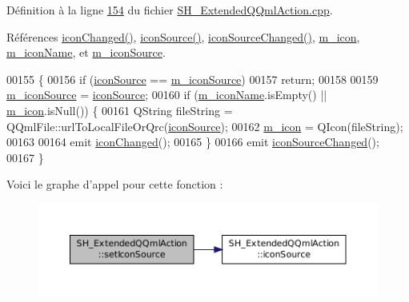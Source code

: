 Définition à la ligne \hyperlink{SH__ExtendedQQmlAction_8cpp_source_l00154}{154} du fichier \hyperlink{SH__ExtendedQQmlAction_8cpp_source}{S\-H\-\_\-\-Extended\-Q\-Qml\-Action.\-cpp}.



Références \hyperlink{classSH__ExtendedQQmlAction_ac47156b58d63ae5408e8d06b3669005c}{icon\-Changed()}, \hyperlink{classSH__ExtendedQQmlAction_a4256635783087124d3df6fa9726e7d55}{icon\-Source()}, \hyperlink{classSH__ExtendedQQmlAction_a86d7d90947e9dcd0d80faba2734f580e}{icon\-Source\-Changed()}, \hyperlink{classSH__ExtendedQQmlAction_a4386f56e28c2c70cfedd16c1d8c2c4a4}{m\-\_\-icon}, \hyperlink{classSH__ExtendedQQmlAction_a3375d1504e5ec862ed05500bf529d95c}{m\-\_\-icon\-Name}, et \hyperlink{classSH__ExtendedQQmlAction_a61c8633eab1fa3b69752074220e785fc}{m\-\_\-icon\-Source}.


\begin{DoxyCode}
00155 \{
00156     \textcolor{keywordflow}{if} (\hyperlink{classSH__ExtendedQQmlAction_a4256635783087124d3df6fa9726e7d55}{iconSource} == \hyperlink{classSH__ExtendedQQmlAction_a61c8633eab1fa3b69752074220e785fc}{m\_iconSource})
00157         \textcolor{keywordflow}{return};
00158 
00159     \hyperlink{classSH__ExtendedQQmlAction_a61c8633eab1fa3b69752074220e785fc}{m\_iconSource} = \hyperlink{classSH__ExtendedQQmlAction_a4256635783087124d3df6fa9726e7d55}{iconSource};
00160     \textcolor{keywordflow}{if} (\hyperlink{classSH__ExtendedQQmlAction_a3375d1504e5ec862ed05500bf529d95c}{m\_iconName}.isEmpty() || \hyperlink{classSH__ExtendedQQmlAction_a4386f56e28c2c70cfedd16c1d8c2c4a4}{m\_icon}.isNull()) \{
00161         QString fileString = QQmlFile::urlToLocalFileOrQrc(\hyperlink{classSH__ExtendedQQmlAction_a4256635783087124d3df6fa9726e7d55}{iconSource});
00162         \hyperlink{classSH__ExtendedQQmlAction_a4386f56e28c2c70cfedd16c1d8c2c4a4}{m\_icon} = QIcon(fileString);
00163 
00164         emit \hyperlink{classSH__ExtendedQQmlAction_ac47156b58d63ae5408e8d06b3669005c}{iconChanged}();
00165     \}
00166     emit \hyperlink{classSH__ExtendedQQmlAction_a86d7d90947e9dcd0d80faba2734f580e}{iconSourceChanged}();
00167 \}
\end{DoxyCode}


Voici le graphe d'appel pour cette fonction \-:
\nopagebreak
\begin{figure}[H]
\begin{center}
\leavevmode
\includegraphics[width=350pt]{classSH__ExtendedQQmlAction_a703b29eb866cdc4d739e3f22ada92fb6_cgraph}
\end{center}
\end{figure}


